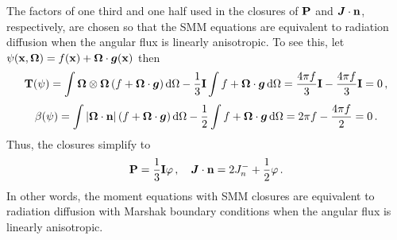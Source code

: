 \documentclass[../doc.tex]{subfiles}
\begin{document}
The factors of one third and one half used in the closures of $\P$ and $\vec{J}\cdot\n$, respectively, are chosen so that the SMM equations are equivalent to radiation diffusion when the angular flux is linearly anisotropic. To see this, let $\psi(\x,\Omegahat) = f(\x) + \Omegahat\cdot\vec{g}(\x)$ then 
	\begin{equation}
		\T(\psi) = \int \Omegahat\otimes\Omegahat\paren{f + \Omegahat\cdot\vec{g}} \ud \Omega - \frac{1}{3}\I \int f + \Omegahat\cdot\vec{g} \ud \Omega = \frac{4\pi f}{3} \I - \frac{4\pi f}{3} \I = 0 \,, 
	\end{equation}
	\begin{equation}
		\beta(\psi) = \int |\Omegahat\cdot\n|\paren{f + \Omegahat\cdot\vec{g}} \ud \Omega - \frac{1}{2}\int f + \Omegahat\cdot\vec{g} \ud \Omega = 2\pi f - \frac{4\pi f}{2} = 0 \,. 
	\end{equation}
Thus, the closures simplify to 
	\begin{equation}
		\P = \frac{1}{3}\I \varphi \,, \quad \vec{J}\cdot\n = 2 J_n^- + \frac{1}{2}\varphi \,. 
	\end{equation}
In other words, the moment equations with SMM closures are equivalent to radiation diffusion with Marshak boundary conditions when the angular flux is linearly anisotropic. 
\end{document}
